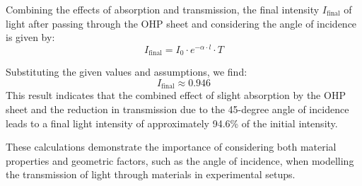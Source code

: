 Combining the effects of absorption and transmission, the final intensity \(I_{\text{final}}\) of light after passing through the OHP sheet and considering the angle of incidence is given by:
\[ I_{\text{final}} = I_0 \cdot e^{-\alpha \cdot l} \cdot T \]

Substituting the given values and assumptions, we find:
\[ I_{\text{final}} \approx 0.946 \]
This result indicates that the combined effect of slight absorption by the OHP sheet and the reduction in transmission due to the 45-degree angle of incidence leads to a final light intensity of approximately 94.6\% of the initial intensity.

These calculations demonstrate the importance of considering both material properties and geometric factors, such as the angle of incidence, when modelling the transmission of light through materials in experimental setups.



